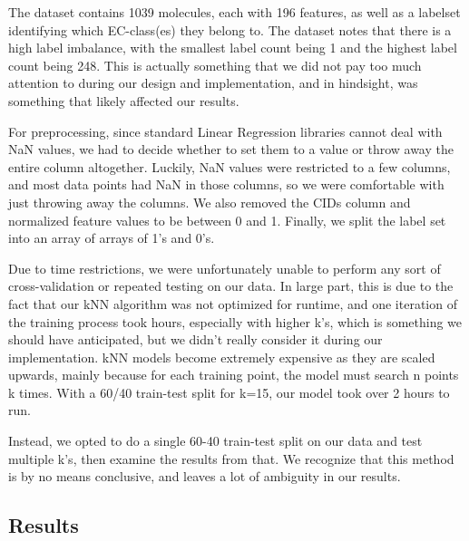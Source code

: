 \documentclass{article}
\begin{document}
The dataset contains 1039 molecules, each with 196 features, as well as a labelset identifying which EC-class(es) they belong to. The dataset notes that there is a high label imbalance, with the smallest label count being 1 and the highest label count being 248. This is actually something that we did not pay too much attention to during our design and implementation, and in hindsight, was something that likely affected our results\cite{enzyme}.

For preprocessing, since standard Linear Regression libraries cannot deal with NaN values, we had to decide whether to set them to a value or throw away the entire column altogether. Luckily, NaN values were restricted to a few columns, and most data points had NaN in those columns, so we were comfortable with just throwing away the columns. We also removed the CIDs column and normalized feature values to be between 0 and 1. Finally, we split the label set into an array of arrays of 1's and 0's. 

Due to time restrictions, we were unfortunately unable to perform any sort of cross-validation or repeated testing on our data. In large part, this is due to the fact that our kNN algorithm was not optimized for runtime, and one iteration of the training process took hours, especially with higher k's, which is something we should have anticipated, but we didn't really consider it during our implementation. kNN models become extremely expensive as they are scaled upwards, mainly because for each training point, the model must search n points k times. With a 60/40 train-test split for k=15, our model took over 2 hours to run. 

Instead, we opted to do a single 60-40 train-test split on our data and test multiple k's, then examine the results from that. We recognize that this method is by no means conclusive, and leaves a lot of ambiguity in our results. 

\subsection{Results}
\end{document}
